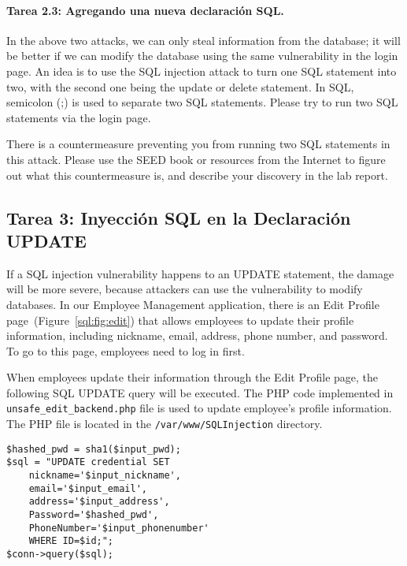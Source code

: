 \paragraph{Tarea 2.3: Agregando una nueva declaración SQL.}  
In the above two attacks, we can only steal information from the database;
it will be better if we can modify the database using the same
vulnerability in the login page.  An idea is to use the SQL injection
attack to turn one SQL statement into two, with the second one being the
update or delete statement. In SQL, semicolon (;) is used to separate two SQL
statements. Please try to run two SQL statements via the login page. 

There is a countermeasure preventing you from running two
SQL statements in this attack. Please use the SEED book 
or resources from the Internet to figure out what this 
countermeasure is, and describe your discovery in the lab report. 



\subsection{Tarea 3: Inyección SQL en la Declaración UPDATE} 

If a SQL injection vulnerability happens to an UPDATE statement, the damage will be more
severe, because attackers can use the vulnerability to modify databases. 
In our Employee Management application, there is an Edit Profile page~(Figure~\ref{sql:fig:edit}) 
that allows employees to
update their profile information, including nickname, email, address, phone number, and
password. To go to this page, employees need to log in first. 


When employees update their information through the Edit Profile page, the
following SQL UPDATE query will be executed. The PHP code implemented in
{\tt unsafe\_edit\_backend.php} file is used to update employee's profile
information. The PHP file is located in the {\tt /var/www/SQLInjection}
directory.


\begin{lstlisting}
$hashed_pwd = sha1($input_pwd);
$sql = "UPDATE credential SET
	nickname='$input_nickname',
	email='$input_email',
	address='$input_address',
	Password='$hashed_pwd',
	PhoneNumber='$input_phonenumber'
	WHERE ID=$id;";
$conn->query($sql);
\end{lstlisting}
 

